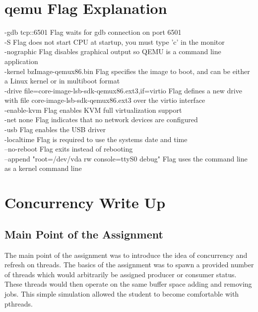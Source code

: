 \documentclass[letterpaper,10pt,serif,draftclsnofoot,onecolumn,compsoc,titlepage]{article}%
\begin{document}
\section{qemu Flag Explanation}
-gdb tcp::6501 Flag waits for gdb connection on port 6501 \\
-S Flag does not start CPU at startup, you must type 'c' in the monitor \\
-nographic Flag disables graphical output so QEMU is a command line application \\
-kernel bzImage-qemux86.bin Flag specifies the image to boot, and can be either
a Linux kernel or in multiboot format \\
-drive file=core-image-lsb-sdk-qemux86.ext3,if=virtio Flag defines a new drive
with file core-image-lsb-sdk-qemux86.ext3 over the virtio interface \\
-enable-kvm Flag enables KVM full virtualization support \\
-net none Flag indicates that no network devices are configured \\
-usb Flag enables the USB driver \\
-localtime Flag is required to use the systems date and time \\
--no-reboot Flag exits instead of rebooting \\
--append "root=/dev/vda rw console=ttyS0 debug" Flag uses the command line as a
kernel command line \\
\section{Concurrency Write Up}
\subsection{Main Point of the Assignment}
The main point of the assignment was to introduce the idea of
concurrency and refresh on threads. The basics of the assignment was
to spawn a provided number of threads which would arbitrarily be assigned
 producer or consumer status. These threads would then operate on the same
 buffer space adding and removing jobs. This simple simulation allowed
 the student to become comfortable with pthreads.
\end{document}
